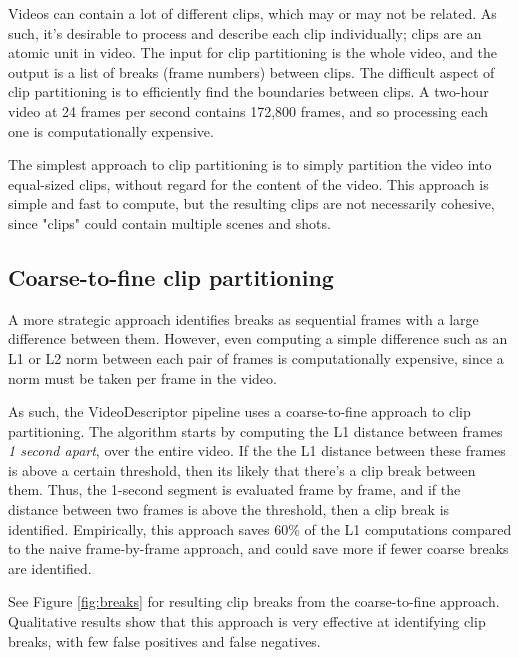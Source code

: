 Videos can contain a lot of different clips, which may or may not be related.
As such, it's desirable to process and describe each clip individually; clips are an atomic unit in video.
The input for clip partitioning is the whole video, and the output is a list of breaks (frame numbers) between clips.
The difficult aspect of clip partitioning is to efficiently find the boundaries between clips.
A two-hour video at 24 frames per second contains 172,800 frames, and so processing each one is computationally expensive.

The simplest approach to clip partitioning is to simply partition the video into equal-sized clips, without regard for the content of the video.
This approach is simple and fast to compute, but the resulting clips are not necessarily cohesive, since "clips" could contain multiple scenes and shots.

\subsection{Coarse-to-fine clip partitioning}
A more strategic approach identifies breaks as sequential frames with a large difference between them.
However, even computing a simple difference such as an L1 or L2 norm between each pair of frames is computationally expensive, since a norm must be taken per frame in the video.

As such, the VideoDescriptor pipeline uses a coarse-to-fine approach to clip partitioning.
The algorithm starts by computing the L1 distance between frames \textit{1 second apart}, over the entire video.
If the the L1 distance between these frames is above a certain threshold, then its likely that there's a clip break between them.
Thus, the 1-second segment is evaluated frame by frame, and if the distance between two frames is above the threshold, then a clip break is identified.
Empirically, this approach saves 60\% of the L1 computations compared to the naive frame-by-frame approach, and could save more if fewer coarse breaks are identified.

See Figure \ref{fig:breaks} for resulting clip breaks from the coarse-to-fine approach.
Qualitative results show that this approach is very effective at identifying clip breaks, with few false positives and false negatives.


